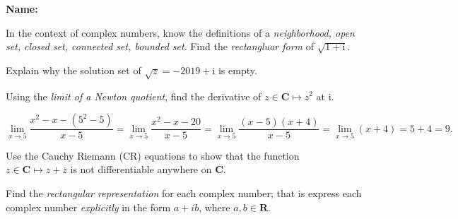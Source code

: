 \documentclass[fleqn,12pt]{exam}
\newcommand{\complex}{\mathbf{C}}
\newcommand{\imag}{\mathrm{i}}
\newcommand{\Arg}{\mathrm{Arg}}
\newcommand{\reals}{\mathbf{R}}
\begin{document}
\large
\vspace{0.1in}
\noindent{}
{\bf Name:}\hrulefill\
\noindent {}
\normalsize


\begin{questions}

\question In the context of complex numbers, know the definitions of a \emph{neighborhood, open set, closed set, connected set, bounded set}.
\question  Find the \emph{rectangluar form} of \(\sqrt{1 + \imag} \).








\begin{solution}%

\end{solution}


\question  Explain why the solution set of  \(\sqrt{z} = -2019 + \imag\) is empty.


\begin{solution}%

\end{solution}

\question  Using the \emph{limit of a Newton quotient}, find the derivative of \(z \in \complex \mapsto z^2\) at \(\imag\).

\begin{solution}%
\[
  \lim_{x \to 5} \frac{x^2 - x - (5^2 - 5)}{x - 5} = \lim_{x \to 5} \frac{x^2 - x - 20}{x-5} =  \lim_{x \to 5} \frac{(x-5)(x+4)}{x-5} = 
\lim_{x \to 5} (x+4) = 5+4=9.
\]

\end{solution}

\question    Use the Cauchy Riemann (CR) equations to show that the function \(z \in \mathbf{C} \mapsto z + \overline{z}\)
is not differentiable anywhere on \(\mathbf{C}\). 
\begin{solution}%

\end{solution}



\question Find the \emph{rectangular representation} for each complex number; that is express each
complex number  \emph{explicitly} in the form \(a + i b\), where \(a,b \in \reals\).


\end{questions}
\end{document}
